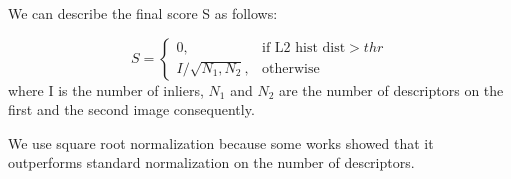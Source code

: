 \documentclass[11pt]{article} %
\begin{document}
We can describe the final score S as follows:

$$
    S = 
\begin{cases}
    0,& \text{if L2 hist dist} > thr\\
    I / \sqrt{N_1, N_2},              & \text{otherwise}
\end{cases}
$$
where I is the number of inliers, $N_1$ and $N_2$ are the number of
descriptors on the first and the second image consequently.

We use square root normalization because some works\cite{jegou:inria-00602325} showed that it
outperforms standard normalization on the number of descriptors.




\end{document}

